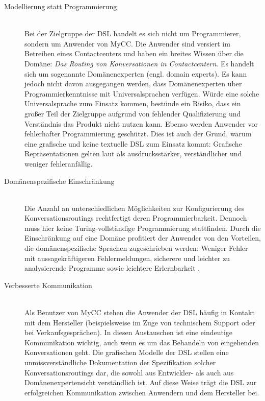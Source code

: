 \begin{description}
\item[Modellierung statt Programmierung] \hfill \\
Bei der Zielgruppe der DSL handelt es sich nicht um Programmierer, sondern um Anwender von MyCC. Die Anwender sind versiert im Betreiben eines Contactcenters und haben ein breites Wissen über die Domäne: \textit{Das Routing von Konversationen in Contactcentern}. Es handelt sich um sogenannte Domänenexperten (engl. domain experts). Es kann jedoch nicht davon ausgegangen werden, dass Domänenexperten über Programmierkenntnisse mit Universalsprachen verfügen. Würde eine solche Universalsprache zum Einsatz kommen, bestünde ein Risiko, dass ein großer Teil der Zielgruppe aufgrund von fehlender Qualifizierung und Verständnis das Produkt nicht nutzen kann. Ebenso werden Anwender vor fehlerhafter Programmierung geschützt. Dies ist auch der Grund, warum eine grafische und keine textuelle DSL zum Einsatz kommt: Grafische Repräsentationen gelten laut \cite[S. 50f]{Kelly:08} als ausdrucksstärker, verständlicher und weniger fehleranfällig.
\item[Domänenspezifische Einschränkung] \hfill \\
Die Anzahl an unterschiedlichen Möglichkeiten zur Konfigurierung des Konversationsroutings rechtfertigt deren Programmierbarkeit. Dennoch muss hier keine Turing-vollständige Programmierung stattfinden. Durch die Einschränkung auf eine Domäne profitiert der Anwender von den Vorteilen, die do\-mä\-nen\-spe\-zi\-fi\-sche Sprachen zugeschrieben werden: Weniger Fehler mit aussagekräftigeren Fehlermeldungen, sicherere und leichter zu analysierende Programme sowie leichtere Erlernbarkeit \cite{Tomassetti:17}.
\item[Verbesserte Kommunikation] \hfill \\
Als Benutzer von MyCC stehen die Anwender der DSL häufig in Kontakt mit dem Hersteller (beispielsweise im Zuge von technischem Support oder bei Verkaufsgesprächen). In diesen Austauschen ist eine eindeutige Kommunikation wichtig, auch wenn es um das Behandeln von eingehenden Konversationen geht. Die grafischen Modelle der DSL stellen eine unmissverständliche Dokumentation der Spezifikation solcher Konversationsroutings dar, die sowohl aus Entwickler- als auch aus Domänenexpertensicht verständlich ist. Auf diese Weise trägt die DSL zur erfolgreichen Kommunikation zwischen Anwendern und dem Hersteller bei.
\end{description}


